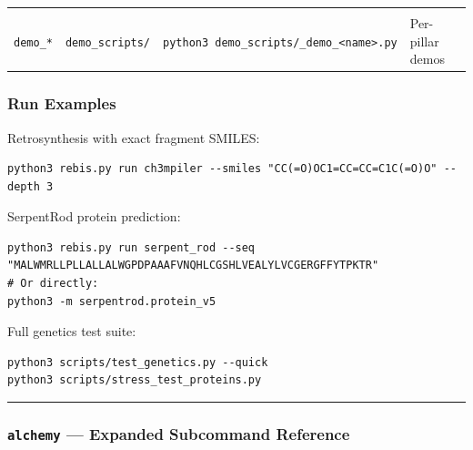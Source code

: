 \begin{longtable}[]{@{}llll@{}}
\begin{minipage}[t]{0.28\columnwidth}
\end{minipage}\tabularnewline
\begin{minipage}[t]{0.17\columnwidth}\raggedright
\texttt{demo\_*}\strut
\end{minipage} & \begin{minipage}[t]{0.24\columnwidth}\raggedright
\texttt{demo\_scripts/}\strut
\end{minipage} & \begin{minipage}[t]{0.19\columnwidth}\raggedright
\texttt{python3\ demo\_scripts/\_demo\_\textless{}name\textgreater{}.py}\strut
\end{minipage} & \begin{minipage}[t]{0.28\columnwidth}\raggedright
Per-pillar demos\strut
\end{minipage}\tabularnewline
\bottomrule
\end{longtable}

\hypertarget{run-examples}{%
\subsubsection{Run Examples}\label{run-examples}}

Retrosynthesis with exact fragment SMILES:

\begin{verbatim}
python3 rebis.py run ch3mpiler --smiles "CC(=O)OC1=CC=CC=C1C(=O)O" --depth 3
\end{verbatim}

SerpentRod protein prediction:

\begin{verbatim}
python3 rebis.py run serpent_rod --seq "MALWMRLLPLLALLALWGPDPAAAFVNQHLCGSHLVEALYLVCGERGFFYTPKTR"
# Or directly:
python3 -m serpentrod.protein_v5
\end{verbatim}

Full genetics test suite:

\begin{verbatim}
python3 scripts/test_genetics.py --quick
python3 scripts/stress_test_proteins.py
\end{verbatim}

\begin{center}\rule{0.5\linewidth}{0.5pt}\end{center}

\hypertarget{alchemy-expanded-subcommand-reference}{%
\subsubsection{\texorpdfstring{\texttt{alchemy} --- Expanded Subcommand
Reference}{alchemy --- Expanded Subcommand Reference}}\label{alchemy-expanded-subcommand-reference}}

